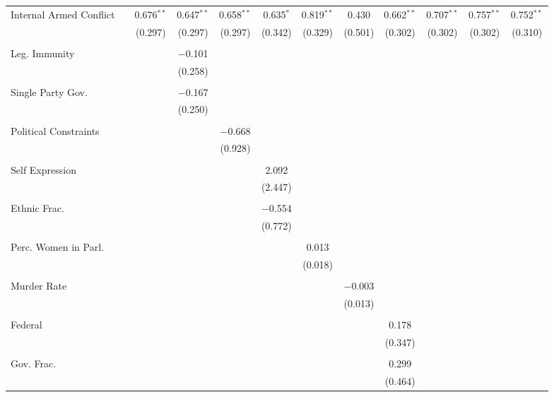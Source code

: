 \documentclass[a4paper]{article}\usepackage[]{graphicx}\usepackage[]{color}
\begin{document}
\begin{table}[H]
\begin{center}
{{\begin{tabular}{@{\extracolsep{5pt}}lccccccccccc}
 Internal Armed Conflict &  & 0.676$^{**}$ & 0.647$^{**}$ & 0.658$^{**}$ & 0.635$^{*}$ & 0.819$^{**}$ & 0.430 & 0.662$^{**}$ & 0.707$^{**}$ & 0.757$^{**}$ & 0.752$^{**}$ \\ 
  &  & (0.297) & (0.297) & (0.297) & (0.342) & (0.329) & (0.501) & (0.302) & (0.302) & (0.302) & (0.310) \\ 
  & & & & & & & & & & & \\ 
 Leg. Immunity &  &  & $-$0.101 &  &  &  &  &  &  &  &  \\ 
  &  &  & (0.258) &  &  &  &  &  &  &  &  \\ 
  & & & & & & & & & & & \\ 
 Single Party Gov. &  &  & $-$0.167 &  &  &  &  &  &  &  &  \\ 
  &  &  & (0.250) &  &  &  &  &  &  &  &  \\ 
  & & & & & & & & & & & \\ 
 Political Constraints &  &  &  & $-$0.668 &  &  &  &  &  &  &  \\ 
  &  &  &  & (0.928) &  &  &  &  &  &  &  \\ 
  & & & & & & & & & & & \\ 
 Self Expression &  &  &  &  & 2.092 &  &  &  &  &  &  \\ 
  &  &  &  &  & (2.447) &  &  &  &  &  &  \\ 
  & & & & & & & & & & & \\ 
 Ethnic Frac. &  &  &  &  & $-$0.554 &  &  &  &  &  &  \\ 
  &  &  &  &  & (0.772) &  &  &  &  &  &  \\ 
  & & & & & & & & & & & \\ 
 Perc. Women in Parl. &  &  &  &  &  & 0.013 &  &  &  &  &  \\ 
  &  &  &  &  &  & (0.018) &  &  &  &  &  \\ 
  & & & & & & & & & & & \\ 
 Murder Rate &  &  &  &  &  &  & $-$0.003 &  &  &  &  \\ 
  &  &  &  &  &  &  & (0.013) &  &  &  &  \\ 
  & & & & & & & & & & & \\ 
 Federal &  &  &  &  &  &  &  & 0.178 &  &  &  \\ 
  &  &  &  &  &  &  &  & (0.347) &  &  &  \\ 
  & & & & & & & & & & & \\ 
 Gov. Frac. &  &  &  &  &  &  &  & 0.299 &  &  &  \\ 
  &  &  &  &  &  &  &  & (0.464) &  &  &  \\ 

\end{tabular}}}
\end{center}
\end{table}
\end{document}

